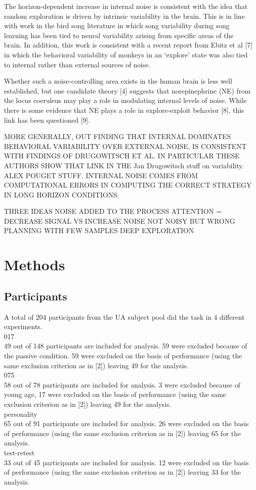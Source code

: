 \documentclass[12pt]{article}
\begin{document}
	
	The horizon-dependent increase in internal noise is consistent with the idea that random exploration is driven by intrinsic variability in the brain. This is in line with work in the bird song literature in which song variability during song learning has been tied to neural variability arising from specific areas of the brain.   In addition, this work is consistent with a recent report from Ebitz et al [7] in which the behavioral variability of monkeys in an `explore' state was also tied to internal rather than external sources of noise. 
	
	Whether such a noise-controlling area exists in the human brain is less well established, but one candidate theory [4] suggests that norepinephrine (NE) from the locus coeruleus may play a role in modulating internal levels of noise.  While there is some evidence that NE plays a role in explore-exploit behavior [8], this link has been questioned [9].
	
	MORE GENERALLY, OUT FINDING THAT INTERNAL DOMINATES BEHAVIORAL VARIABILITY OVER EXTERNAL NOISE, IS CONSISTENT WITH FINDINGS OF DRUGOWITSCH ET AL.  IN PARTICULAR THESE AUTHORS SHOW THAT 
	LINK IN THE Jan Drugowitsch stuff on variability.  ALEX POUGET STUFF. INTERNAL NOISE COMES FROM COMPUTATIONAL ERRORS IN COMPUTING THE CORRECT STRATEGY IN LONG  HORIZON CONDITIONS.
	
	
	THREE IDEAS
	    NOISE ADDED TO THE PROCESS
	    ATTENTION = DECREASE SIGNAL VS INCREASE NOISE
	    NOT NOISY BUT WRONG
	    PLANNING WITH FEW SAMPLES DEEP EXPLORATION
	    
	
	
	\section*{Methods}
	\subsection*{Participants}
	A total of 204 participants from the UA subject pool did the task in 4 different experiments. \\
	 017\\ 
	 49 out of 148 participants are included for analysis. 59 were excluded because of the passive condition. 59 were excluded on the basis of performance (using the same exclusion criterion as in [2]) leaving 49 for the analysis.\\
	075\\ 
	 58 out of 78 participants are included for analysis. 3 were excluded because of young age, 17 were excluded on the basis of performance (using the same exclusion criterion as in [2]) leaving 49 for the analysis.\\
	personality \\
	 65 out of 91 participants are included for analysis. 26 were excluded on the basis of performance (using the same exclusion criterion as in [2]) leaving 65 for the analysis.\\
     test-retest \\
	 33 out of 45 participants are included for analysis. 12 were excluded on the basis of performance (using the same exclusion criterion as in [2]) leaving 33 for the analysis.\\
	 
\end{document}
